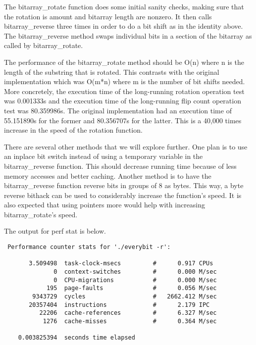 \documentclass[12pt]{article}
\begin{document}
The bitarray\_rotate function does some initial sanity checks, making sure that 
the rotation is amount and bitarray length are nonzero.  It then calls 
bitarray\_reverse three times in order to do a bit shift as in the identity 
above.  The bitarray\_reverse method swaps individual bits in a section of the 
bitarray as called by bitarray\_rotate.  

The performance of the bitarray\_rotate method should be O(n) where n is the 
length of the substring that is rotated.  This contrasts with the original 
implementation which was O(m*n) where m is the number of bit shifts needed.  
More concretely, the execution time of the long-running rotation operation test 
was 0.001333s and the execution time of the long-running flip count operation 
test was 80.359986s.  The original implementation had an execution time of 
55.151890s for the former and 80.356707s for the latter.  This is a 40,000 times 
increase in the speed of the rotation function.  

There are several other methods that we will explore further.  One plan is to 
use an inplace bit switch instead of using a temporary variable in the 
bitarray\_reverse function.  This should decrease running time because of less 
memory accesses and better caching.  Another method is to have the 
bitarray\_reverse function reverse bits in groups of 8 as bytes.  This way, a 
byte reverse bithack can be used to considerably increase the function's speed.  
It is also expected that using pointers more would help with increasing 
bitarray\_rotate's speed.  

The output for perf stat is below.  
\begin{verbatim}
 Performance counter stats for './everybit -r':

       3.509498  task-clock-msecs         #      0.917 CPUs 
              0  context-switches         #      0.000 M/sec
              0  CPU-migrations           #      0.000 M/sec
            195  page-faults              #      0.056 M/sec
        9343729  cycles                   #   2662.412 M/sec
       20357404  instructions             #      2.179 IPC  
          22206  cache-references         #      6.327 M/sec
           1276  cache-misses             #      0.364 M/sec

    0.003825394  seconds time elapsed
\end{verbatim}
\end{document}
